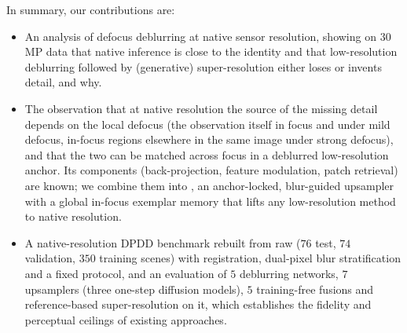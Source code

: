 In summary, our contributions are:
\begin{itemize}
  \item An analysis of defocus deblurring at native sensor resolution, showing on $30$\,MP data that
        native inference is close to the identity and that low-resolution deblurring followed by
        (generative) super-resolution either loses or invents detail, and why.
  \item The observation that at native resolution the source of the missing detail depends on the local
        defocus (the observation itself in focus and under mild defocus, in-focus regions elsewhere in
        the same image under strong defocus), and that the two can be matched across focus in a
        deblurred low-resolution anchor. Its components (back-projection, feature modulation, patch
        retrieval) are known; we combine them into \method, an anchor-locked, blur-guided upsampler with
        a global in-focus exemplar memory that lifts any low-resolution method to native resolution.
  \item A native-resolution DPDD benchmark rebuilt from raw ($76$ test, $74$ validation, $350$
        training scenes) with registration, dual-pixel blur stratification and a fixed protocol, and
        an evaluation of $5$ deblurring networks, $7$ upsamplers (three one-step diffusion models),
        $5$ training-free fusions and reference-based super-resolution on it, which establishes the
        fidelity and perceptual ceilings of existing approaches.
\end{itemize}
